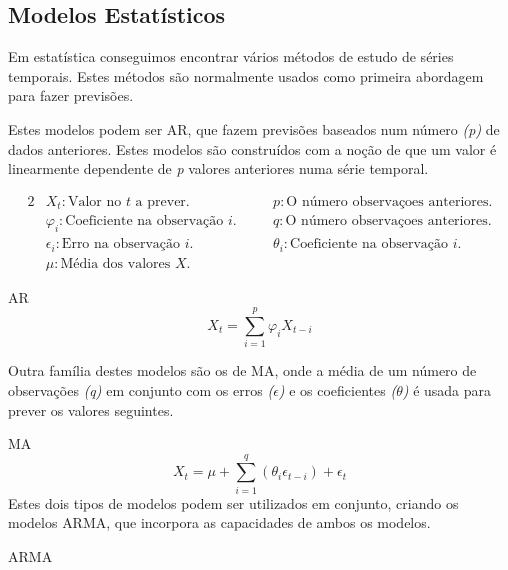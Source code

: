 \subsection{Modelos Estatísticos}

Em estatística conseguimos encontrar vários métodos de estudo de séries temporais. Estes métodos são normalmente usados como primeira abordagem para fazer previsões.\par
Estes modelos podem ser \gls{AR}, que fazem previsões baseados num número \textit{(p)} de dados anteriores. Estes modelos são construídos com a noção de que um valor é linearmente dependente de \textit{p} valores anteriores numa série temporal.\par

\begin{alignat*}{2} 
    & X_{t} : \text{Valor no } t \text{ a prever.} &\quad& p : \text{O número observaçoes anteriores.} \\
    & \varphi_{i} : \text{Coeficiente na observação } i. &\quad& q : \text{O número observaçoes anteriores.} \\
    & \epsilon_{i} : \text{Erro na observação } i. &\quad& \theta_{i} : \text{Coeficiente na observação } i \text{.} \\ 
    & \mu : \text{Média dos valores } X \text{.} 
\end{alignat*}

\bigskip
\gls{AR} \\

\begin{equation} \label{eq:ar} 
    X_{t} = \sum_{i=1}^{p}\varphi_{i} X_{t-i} 
\end{equation}
\smallskip

Outra família destes modelos são os de \gls{MA}, onde a média de um número de observações \textit{(q)} em conjunto com os erros \textit{($\epsilon$)} e os coeficientes \textit{($\theta$)} é usada para prever os valores seguintes.\par
\bigskip
\gls{MA} \\

\begin{equation} \label{eq:ma} 
    X_{t} = \mu + \sum_{i=1}^{q}(\theta_{i} \epsilon_{t-i}) + \epsilon_{t}
\end{equation}
\smallskip
Estes dois tipos de modelos podem ser utilizados em conjunto, criando os modelos \gls{ARMA}, que incorpora as capacidades de ambos os modelos.\par

\bigskip
\gls{ARMA} \\


